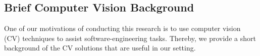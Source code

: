 %


\subsection{Brief Computer Vision Background}\label{sec:cv}

One of our motivations of conducting this research is to use computer vision (CV) techniques to assist software-engineering tasks. 
Thereby, we provide a short background of the CV solutions that are useful in our setting.

